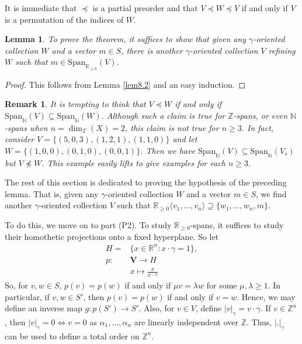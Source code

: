 \documentclass[notitlepage, 10pt]{article}
\theoremstyle{defin}
\theoremstyle{theo}
\newtheorem{lem}{Lemma}[defn]
\theoremstyle{rema}
\newtheorem{rem}{Remark}[section]
\newcommand{\R}{\mathbb{R}}
\newcommand{\N}{\mathbb{N}}
\newcommand{\Z}{\mathbb{Z}}
\begin{document}
\addtocounter{defn}{-1}
\addtocounter{lem}{3}

It is immediate that $\preceq$ is a partial preorder and that $V\preceq W \preceq V$ if and only if $V$ is a permutation of the indices of $W$.


\begin{lem}\label{lem3}
    To prove the theorem, it suffices to show that given any $\gamma$-oriented collection $W$ and a vector $m\in S$, there is another $\gamma$-oriented collection $V$ refining $W$ such that $m\in \mathrm{Span}_{\R_{\geq 0}}(V)$.
\end{lem}

\begin{proof}
    This follows from Lemma \ref{lem8.2} and an easy induction.
\end{proof}

\begin{rem}
    It is tempting to think that $V \preceq W$ if and only if $\mathrm{Span}_\N(V) \subseteq \mathrm{Span}_\N(W)$. Although such a claim is true for $\Z$-spans, or even $\N$-spans when $n=\dim_
    \Z(X) = 2$, this claim is not true for $n\geq 3$. In fact, consider $V = \{ (5,0,3), (1,2,1), (1,1,0)\}$ and let $W = \{(1,0,0), (0,1,0), (0,0,1)\}$. Then we have $\mathrm{Span}_{\N}(V) \subseteq \mathrm{Span}_\N(V_s)$ but $V\npreceq W$. This example easily lifts to give examples for each $n\geq 3$.
\end{rem}

The rest of this section is dedicated to proving the hypothesis of the preceding lemma. That is, given any $\gamma$-oriented collection $W$ and a vector $m\in S$, we find another $\gamma$-oriented collection $V$ such that $\R_{\geq 0}\langle v_1,\ldots,v_n\rangle \supseteq \{w_1,\ldots, w_n,m\}$. 

To do this, we move on to part (P2). To study $\R_{\geq 0}$-spans, it suffices to study their homothetic projections onto a fixed hyperplane. So let 
\begin{align*}
    H = &\{x\in \R^n : x\cdot \gamma =1\}, \\
    p: &\mathbf{V} \longrightarrow H \\
    & x \longmapsto \frac{x}{x\cdot\gamma}
\end{align*}
So, for $v, w\in S$, $p(v)=p(w)$ if and only if $\mu v=\lambda w$ for some $\mu, \lambda\geq 1$. In particular, if $v,w\in S'$, then $p(v)=p(w)$ if and only if $v=w$. Hence, we may define an inverse map $g : p(S') \to S'$. Also, for $v\in V$, define $|v|_\gamma = v\cdot \gamma$. If $v\in \Z^n$, then $|v|_\gamma = 0 \iff v=0$ as $\alpha_1,\ldots, \alpha_n$ are linearly independent over $\Z$. Thus, $|.|_\gamma$ can be used to define a total order on $\Z^n$.
\end{document}
